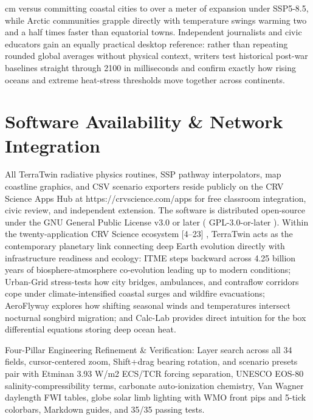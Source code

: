 \documentclass[10pt,letterpaper]{article}
\begin{document}
cm versus committing coastal cities to over a meter of expansion under SSP5-8.5, while Arctic communities grapple directly with temperature swings warming two and a half times faster than equatorial towns. Independent journalists and civic educators gain an equally practical desktop reference: rather than repeating rounded global averages without physical context, writers test historical post-war baselines straight through 2100 in milliseconds and confirm exactly how rising oceans and extreme heat-stress thresholds move together across continents.

\section{Software Availability \& Network Integration}
All TerraTwin radiative physics routines, SSP pathway interpolators, map coastline graphics, and CSV scenario exporters reside publicly on the CRV Science Apps Hub at https://crvscience.com/apps for free classroom integration, civic review, and independent extension. The software is distributed open-source under the GNU General Public License v3.0 or later ( GPL-3.0-or-later ). Within the twenty-application CRV Science ecosystem [4--23] , TerraTwin acts as the contemporary planetary link connecting deep Earth evolution directly with infrastructure readiness and ecology: ITME steps backward across 4.25 billion years of biosphere-atmosphere co-evolution leading up to modern conditions; Urban-Grid stress-tests how city bridges, ambulances, and contraflow corridors cope under climate-intensified coastal surges and wildfire evacuations; AeroFlyway explores how shifting seasonal winds and temperatures intersect nocturnal songbird migration; and Calc-Lab provides direct intuition for the box differential equations storing deep ocean heat.

Four-Pillar Engineering Refinement \& Verification: Layer search across all 34 fields, cursor-centered zoom, Shift+drag bearing rotation, and scenario presets pair with Etminan 3.93 W/m2 ECS/TCR forcing separation, UNESCO EOS-80 salinity-compressibility terms, carbonate auto-ionization chemistry, Van Wagner daylength FWI tables, globe solar limb lighting with WMO front pips and 5-tick colorbars, Markdown guides, and 35/35 passing tests.
\end{document}
